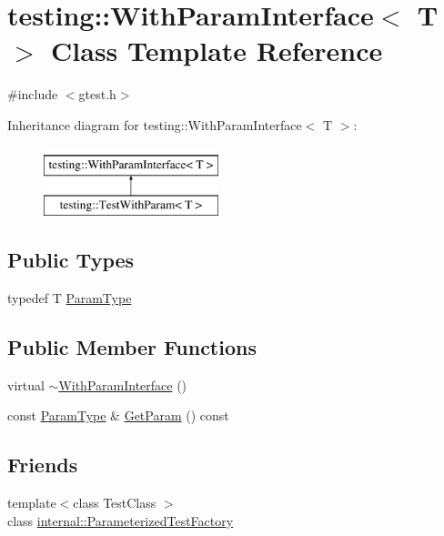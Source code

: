 \hypertarget{classtesting_1_1_with_param_interface}{\section{testing\-:\-:With\-Param\-Interface$<$ T $>$ Class Template Reference}
\label{classtesting_1_1_with_param_interface}
}


{\ttfamily \#include $<$gtest.\-h$>$}

Inheritance diagram for testing\-:\-:With\-Param\-Interface$<$ T $>$\-:\begin{figure}[H]
\begin{center}
\leavevmode
\includegraphics[height=2.000000cm]{classtesting_1_1_with_param_interface}
\end{center}
\end{figure}
\subsection*{Public Types}
\begin{DoxyCompactItemize}
\item 
typedef T \hyperlink{classtesting_1_1_with_param_interface_a343febaaebf1f025bda484f841d4fec1}{Param\-Type}
\end{DoxyCompactItemize}
\subsection*{Public Member Functions}
\begin{DoxyCompactItemize}
\item 
virtual \hyperlink{classtesting_1_1_with_param_interface_a4e170bd42fa5e8ce48b80cee6bb52e26}{$\sim$\-With\-Param\-Interface} ()
\item 
const \hyperlink{classtesting_1_1_with_param_interface_a343febaaebf1f025bda484f841d4fec1}{Param\-Type} \& \hyperlink{classtesting_1_1_with_param_interface_a38cdaa583cac86d14a79f91536d6e442}{Get\-Param} () const 
\end{DoxyCompactItemize}
\subsection*{Friends}
\begin{DoxyCompactItemize}
\item 
{\footnotesize template$<$class Test\-Class $>$ }\\class \hyperlink{classtesting_1_1_with_param_interface_a7543eb7df89f00fff517dba24bc11dd5}{internal\-::\-Parameterized\-Test\-Factory}
\end{DoxyCompactItemize}


